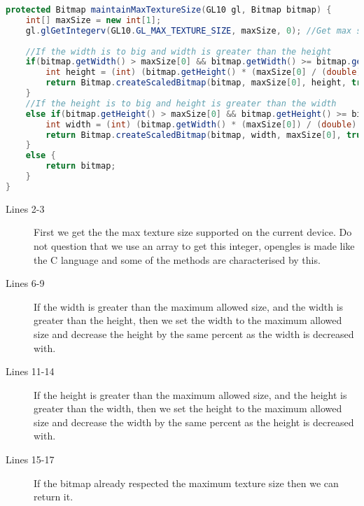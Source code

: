 \begin{lstlisting}[language=java,caption={Scales the bitmap if the size of it is not supported on the current device.},label=lst:maintain] 
protected Bitmap maintainMaxTextureSize(GL10 gl, Bitmap bitmap) {
    int[] maxSize = new int[1];
    gl.glGetIntegerv(GL10.GL_MAX_TEXTURE_SIZE, maxSize, 0); //Get max supported texture size on this device
    
    //If the width is to big and width is greater than the height
    if(bitmap.getWidth() > maxSize[0] && bitmap.getWidth() >= bitmap.getHeight()) {
        int height = (int) (bitmap.getHeight() * (maxSize[0] / (double) bitmap.getWidth()));
        return Bitmap.createScaledBitmap(bitmap, maxSize[0], height, true);
    }
    //If the height is to big and height is greater than the width
    else if(bitmap.getHeight() > maxSize[0] && bitmap.getHeight() >= bitmap.getWidth()) {
        int width = (int) (bitmap.getWidth() * (maxSize[0]) / (double) bitmap.getHeight());
        return Bitmap.createScaledBitmap(bitmap, width, maxSize[0], true);
    }
    else {
        return bitmap;
    }
}
\end{lstlisting}

\begin{description}
\item[Lines 2-3] First we get the the max texture size supported on the current device. Do not question that we use an array to get this integer, \ac{opengles} is made like the C language and some of the methods are characterised by this.
\item[Lines 6-9] If the width is greater than the maximum allowed size, and the width is greater than the height, then we set the width to the maximum allowed size and decrease the height by the same percent as the width is decreased with.
\item[Lines 11-14] If the height is greater than the maximum allowed size, and the height is greater than the width, then we set the height to the maximum allowed size and decrease the width by the same percent as the height is decreased with.
\item[Lines 15-17] If the bitmap already respected the maximum texture size then we can return it.
\end{description}